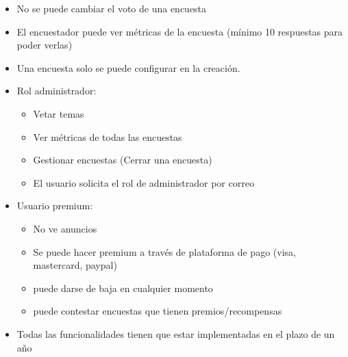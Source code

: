 \documentclass[a4paper,11pt]{report}
\begin{document}
\begin{itemize}
        \item No se puede cambiar el voto de una encuesta
        \item El encuestador puede ver métricas de la encuesta
        (mínimo 10 respuestas para poder verlas)
        \item Una encuesta solo se puede configurar en la creación.
        \item Rol administrador:
        \begin{itemize}
            \item Vetar temas
            \item Ver métricas de todas las encuestas
            \item Gestionar encuestas (Cerrar una encuesta)
            \item El usuario solicita el rol de administrador por correo
        \end{itemize}
        \item Usuario premium:
        \begin{itemize}
            \item No ve anuncios
            \item Se puede hacer premium a través de plataforma de pago
            (visa, mastercard, paypal)
            \item puede darse de baja en cualquier momento
            \item puede contestar encuestas que tienen premios/recompensas
        \end{itemize}
        \item Todas las funcionalidades tienen que estar implementadas en el
        plazo de un año
	\end{itemize}
\end{document}
